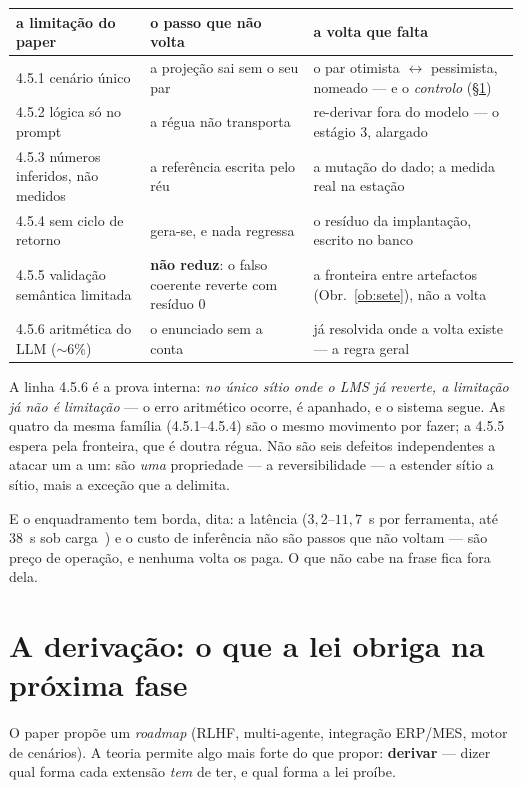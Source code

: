 \documentclass[11pt,a4paper]{article}
\begin{document}
\begin{center}\small
\begin{tabular}{@{}p{4.2cm}p{4.9cm}p{5.2cm}@{}}
\toprule
a limitação do paper & o passo que não volta & a volta que falta \\
\midrule
4.5.1 cenário único & a projeção sai sem o seu par & o par otimista $\leftrightarrow$ pessimista, nomeado --- e o \emph{controlo} (\S\ref{sec:deriva}) \\
4.5.2 lógica só no prompt & a régua não transporta & re-derivar fora do modelo --- o estágio 3, alargado \\
4.5.3 números inferidos, não medidos & a referência escrita pelo réu & a mutação do dado; a medida real na estação \\
4.5.4 sem ciclo de retorno & gera-se, e nada regressa & o resíduo da implantação, escrito no banco \\
4.5.5 validação semântica limitada & \textbf{não reduz}: o falso coerente reverte com resíduo $0$ & a fronteira entre artefactos (Obr.~\ref{ob:sete}), não a volta \\
4.5.6 aritmética do LLM ($\sim6\%$) & o enunciado sem a conta & já resolvida onde a volta existe --- a regra geral \\
\bottomrule
\end{tabular}
\end{center}

\noindent A linha 4.5.6 é a prova interna: \emph{no único sítio onde o LMS já reverte, a limitação já
não é limitação} --- o erro aritmético ocorre, é apanhado, e o sistema segue. As quatro da mesma
família (4.5.1--4.5.4) são o mesmo movimento por fazer; a 4.5.5 espera pela fronteira, que é doutra
régua. Não são seis defeitos independentes a atacar um a um: são \emph{uma} propriedade --- a
reversibilidade --- a estender sítio a sítio, mais a exceção que a delimita.

\smallskip
\noindent E o enquadramento tem borda, dita: a latência ($3{,}2$--$11{,}7$~s por ferramenta, até
$38$~s sob carga~\cite{lms}) e o custo de inferência não são passos que não voltam --- são preço de
operação, e nenhuma volta os paga. O que não cabe na frase fica fora dela.

\section{A derivação: o que a lei obriga na próxima fase}\label{sec:deriva}

O paper propõe um \emph{roadmap} (RLHF, multi-agente, integração ERP/MES, motor de cenários). A teoria
permite algo mais forte do que propor: \textbf{derivar} --- dizer qual forma cada extensão \emph{tem}
de ter, e qual forma a lei proíbe.
\end{document}
